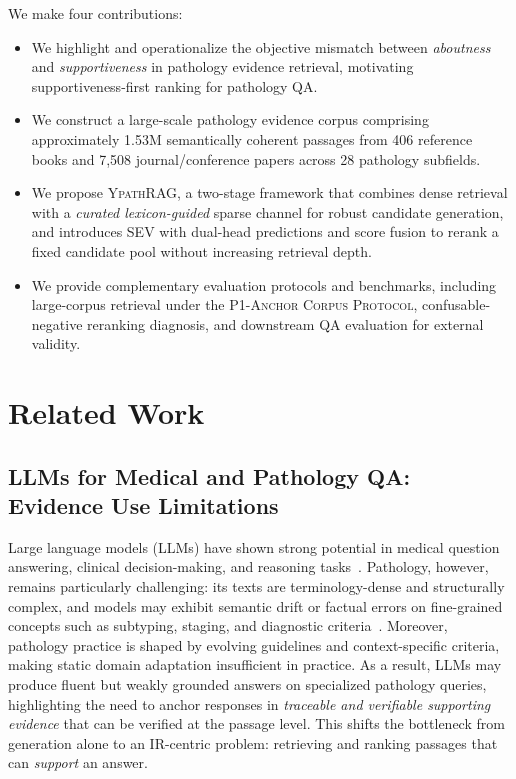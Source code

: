 \documentclass[preprint,12pt,a4paper]{elsarticle}
\begin{document}
We make four contributions:
\begin{itemize}
  \item We highlight and operationalize the objective mismatch between \emph{aboutness} and \emph{supportiveness} in pathology evidence retrieval, motivating supportiveness-first ranking for pathology QA.
  \item We construct a large-scale pathology evidence corpus comprising approximately 1.53M semantically coherent passages from 406 reference books and 7{,}508 journal/conference papers across 28 pathology subfields.
  \item We propose \textsc{YpathRAG}, a two-stage framework that combines dense retrieval with a \emph{curated lexicon-guided} sparse channel for robust candidate generation, and introduces SEV with dual-head predictions and score fusion to rerank a fixed candidate pool without increasing retrieval depth.
  \item We provide complementary evaluation protocols and benchmarks, including large-corpus retrieval under the \textsc{P1-Anchor Corpus Protocol}, confusable-negative reranking diagnosis, and downstream QA evaluation for external validity.
\end{itemize}



\section{Related Work}
\label{sec:related}

\subsection{LLMs for Medical and Pathology QA: Evidence Use Limitations}
Large language models (LLMs) have shown strong potential in medical question answering, clinical decision-making, and reasoning tasks~\cite{singhal2023llm4clinical,lievin2024canllmsreasonmedical}.
Pathology, however, remains particularly challenging: its texts are terminology-dense and structurally complex, and models may exhibit semantic drift or factual errors on fine-grained concepts such as subtyping, staging, and diagnostic criteria~\cite{luo2022biogpt,wu2023pmcllama}.
Moreover, pathology practice is shaped by evolving guidelines and context-specific criteria, making static domain adaptation insufficient in practice.
As a result, LLMs may produce fluent but weakly grounded answers on specialized pathology queries, highlighting the need to anchor responses in \emph{traceable and verifiable supporting evidence} that can be verified at the passage level.
This shifts the bottleneck from generation alone to an IR-centric problem: retrieving and ranking passages that can \emph{support} an answer.
\end{document}
